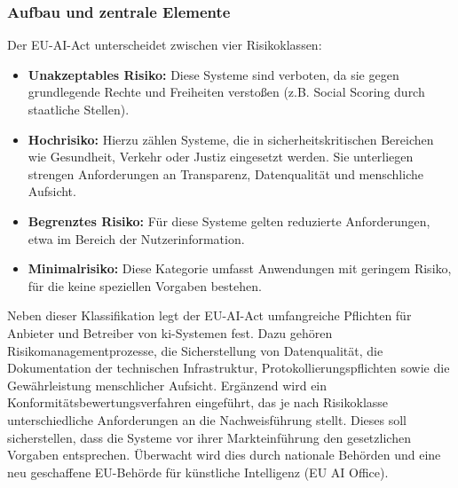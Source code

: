 \subsubsection{Aufbau und zentrale Elemente}
\label{subsubsec:eu_aufbau}
Der EU-AI-Act unterscheidet zwischen vier Risikoklassen:
\begin{itemize}
    \item \textbf{Unakzeptables Risiko:} Diese Systeme sind verboten, da sie gegen grundlegende Rechte und Freiheiten verstoßen (z.B. Social Scoring durch staatliche Stellen).
    \item \textbf{Hochrisiko:} Hierzu zählen Systeme, die in sicherheitskritischen Bereichen wie Gesundheit, Verkehr oder Justiz eingesetzt werden. Sie unterliegen strengen Anforderungen an Transparenz, Datenqualität und menschliche Aufsicht.
    \item \textbf{Begrenztes Risiko:} Für diese Systeme gelten reduzierte Anforderungen, etwa im Bereich der Nutzerinformation.
    \item \textbf{Minimalrisiko:} Diese Kategorie umfasst Anwendungen mit geringem Risiko, für die keine speziellen Vorgaben bestehen.
\end{itemize}
Neben dieser Klassifikation legt der EU-AI-Act umfangreiche Pflichten für Anbieter und Betreiber von \ac{ki}-Systemen fest.
Dazu gehören Risikomanagementprozesse, die Sicherstellung von Datenqualität, die Dokumentation der technischen Infrastruktur, Protokollierungspflichten sowie die Gewährleistung menschlicher Aufsicht.
Ergänzend wird ein Konformitätsbewertungsverfahren eingeführt, das je nach Risikoklasse unterschiedliche Anforderungen an die Nachweisführung stellt.
Dieses soll sicherstellen, dass die Systeme vor ihrer Markteinführung den gesetzlichen Vorgaben entsprechen.
Überwacht wird dies durch nationale Behörden und eine neu geschaffene EU-Behörde für künstliche Intelligenz (EU AI Office).

